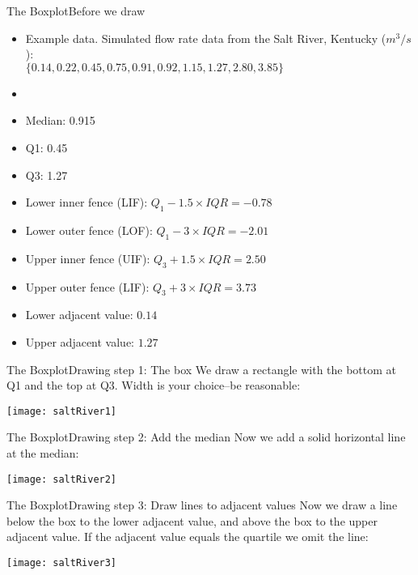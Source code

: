 \documentclass[xcolor=dvipsnames]{beamer}
\begin{document}
\begin{frame}{The Boxplot}{Before we draw}
	\begin{itemize}
		\item Example data. Simulated flow rate data from the Salt River, Kentucky ($m^3 / s$): \\
		$\{0.14, 0.22, 0.45, 0.75, 0.91, 0.92, 1.15, 1.27, 2.80, 3.85\}$ \pause
		\item[]
		\item Median: 0.915 \pause
		\item Q1: 0.45 \pause
		\item Q3: 1.27 \pause
		\item Lower inner fence (LIF): $Q_1 - 1.5 \times IQR = -0.78 $ \pause
		\item Lower outer fence (LOF): $Q_1 - 3 \times IQR = -2.01$\pause
		\item Upper inner fence (UIF): $Q_3 + 1.5 \times IQR = 2.50 $\pause
		\item Upper outer fence (LIF): $Q_3 + 3 \times IQR = 3.73 $\pause
		\item Lower adjacent value: $0.14$\pause
		\item Upper adjacent value: $1.27$
	\end{itemize}
\end{frame}

\begin{frame}{The Boxplot}{Drawing step 1: The box}
	We draw a rectangle with the bottom at Q1 and the top at Q3. Width is your choice--be reasonable:
	\begin{center}
		\texttt{[image: saltRiver1]}
	\end{center}
\end{frame}

\begin{frame}{The Boxplot}{Drawing step 2: Add the median}
	Now we add a solid horizontal line at the median:
	\begin{center}
		\texttt{[image: saltRiver2]}
	\end{center}
\end{frame}

\begin{frame}{The Boxplot}{Drawing step 3: Draw lines to adjacent values}
	Now we draw a line below the box to the lower adjacent value, and above the box to the upper adjacent value. If the adjacent value equals the quartile we omit the line:
	\begin{center}
		\texttt{[image: saltRiver3]}
	\end{center}
\end{frame}
\end{document}
